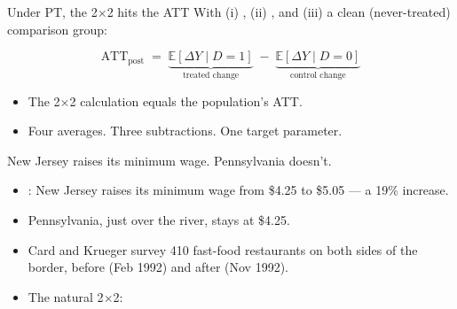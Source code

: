 \documentclass[aspectratio=169,11pt]{beamer}
\begin{document}
\begin{frame}{Under PT, the 2$\times$2 hits the ATT}
\vspace{0.5em}
With (i) , (ii) , and (iii) a clean (never-treated) comparison group:
\vspace{0.4em}
\begin{center}
\Large
\[
\text{ATT}_{\text{post}} \;=\; \underbrace{\mathbb{E}[\Delta Y \mid D=1]}_{\text{treated change}} \;-\; \underbrace{\mathbb{E}[\Delta Y \mid D=0]}_{\text{control change}}
\]
\end{center}
\vspace{0.4em}
\begin{itemize}\setlength\itemsep{4pt}
  \item The 2$\times$2 calculation equals the population's ATT.
  \item Four averages. Three subtractions. One target parameter.
\end{itemize}
\vspace{0.6em}
\begin{center}
\end{center}
\end{frame}

\begin{frame}{New Jersey raises its minimum wage. Pennsylvania doesn't.}
\vspace{0.4em}
\begin{itemize}
  \item {}: New Jersey raises its minimum wage from \$4.25 to \$5.05 --- a 19\% increase.
  \item Pennsylvania, just over the river, stays at \$4.25.
  \item Card and Krueger survey 410 fast-food restaurants on both sides of the border, before (Feb 1992) and after (Nov 1992).
  \item The natural 2$\times$2: 
\end{itemize}
\vspace{0.4em}
\end{frame}
\end{document}
